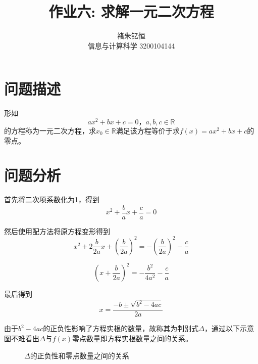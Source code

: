\documentclass{article}
\title{作业六: 求解一元二次方程}
\author{褚朱钇恒 \\ 信息与计算科学 3200104144}
\begin{document}
\maketitle
\section{问题描述}
形如
$$
ax^2+bx+c=0，a,b,c \in \mathbb{R}
$$
的方程称为一元二次方程，求$x_0 \in \mathbb{R}$满足该方程等价于求$f(x)=ax^2+bx+c$的零点。
\section{问题分析}
     首先将二次项系数化为1，得到$$x^2+\frac{b}{a}x+\frac{c}{a}=0$$
     
     然后使用配方法将原方程变形得到$$x^2+2\frac{b}{2a}x+(\frac{b}{2a})^2=-(\frac{b}{2a})^2-\frac{c}{a}$$

     $$(x+\frac{b}{2a})^2=-\frac{b^2}{4a^2}-\frac{c}{a}$$

     最后得到$$x=\frac{-b\pm\sqrt{b^2-4ac}}{2a}$$

     由于$b^2-4ac$的正负性影响了方程实根的数量，故称其为判别式$\Delta$，通过以下示意图不难看出$\Delta$与$f(x)$零点数量即方程实根数量之间的关系。

     \begin{figure}[H]
          \begin{center}
               
          \end{center}
          \caption{$\Delta$的正负性和零点数量之间的关系}
     \end{figure}
\end{document}
